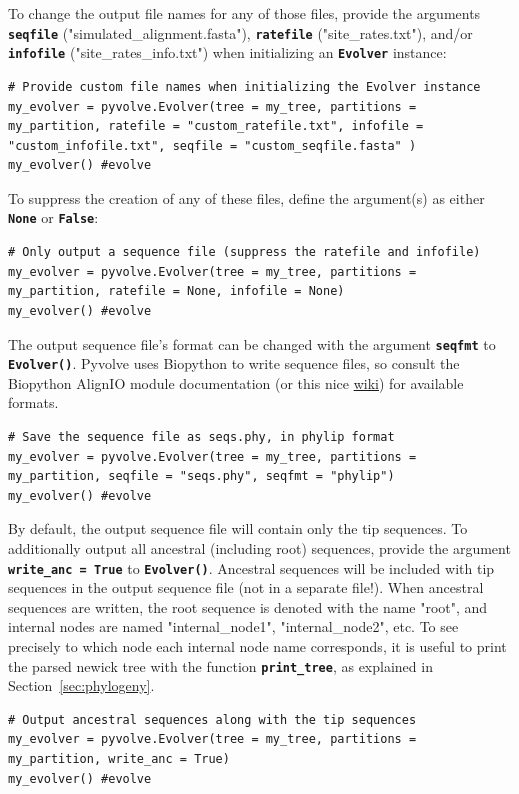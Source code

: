 \documentclass{article}
\newcommand{\code}[1]{\textbf{\texttt{\small{#1}}}}
\begin{document}
To change the output file names for any of those files, provide the arguments \code{seqfile} ("simulated\_alignment.fasta"), \code{ratefile} ("site\_rates.txt"), and/or \code{infofile} ("site\_rates\_info.txt") when initializing an \code{Evolver} instance:
\begin{lstlisting}
# Provide custom file names when initializing the Evolver instance
my_evolver = pyvolve.Evolver(tree = my_tree, partitions = my_partition, ratefile = "custom_ratefile.txt", infofile = "custom_infofile.txt", seqfile = "custom_seqfile.fasta" )
my_evolver() #evolve
\end{lstlisting}

To suppress the creation of any of these files, define the argument(s) as either \code{None} or \code{False}:
\begin{lstlisting}
# Only output a sequence file (suppress the ratefile and infofile)
my_evolver = pyvolve.Evolver(tree = my_tree, partitions = my_partition, ratefile = None, infofile = None)
my_evolver() #evolve
\end{lstlisting}

The output sequence file's format can be changed with the argument \code{seqfmt} to \code{Evolver()}. Pyvolve uses Biopython to write sequence files, so consult the Biopython AlignIO module documentation (or this nice \href{http://biopython.org/wiki/AlignIO}{wiki}) for available formats.
\begin{lstlisting}
# Save the sequence file as seqs.phy, in phylip format 
my_evolver = pyvolve.Evolver(tree = my_tree, partitions = my_partition, seqfile = "seqs.phy", seqfmt = "phylip")
my_evolver() #evolve
\end{lstlisting}

By default, the output sequence file will contain only the tip sequences. To additionally output all ancestral (including root) sequences, provide the argument \code{write\_anc = True} to \code{Evolver()}. Ancestral sequences will be included with tip sequences in the output sequence file (not in a separate file!). When ancestral sequences are written, the root sequence is denoted with the name "root", and internal nodes are named "internal\_node1", "internal\_node2", etc. To see precisely to which node each internal node name corresponds, it is useful to print the parsed newick tree with the function \code{print\_tree}, as explained in Section~\ref{sec:phylogeny}.
\begin{lstlisting}
# Output ancestral sequences along with the tip sequences
my_evolver = pyvolve.Evolver(tree = my_tree, partitions = my_partition, write_anc = True)
my_evolver() #evolve
\end{lstlisting}
\end{document}
